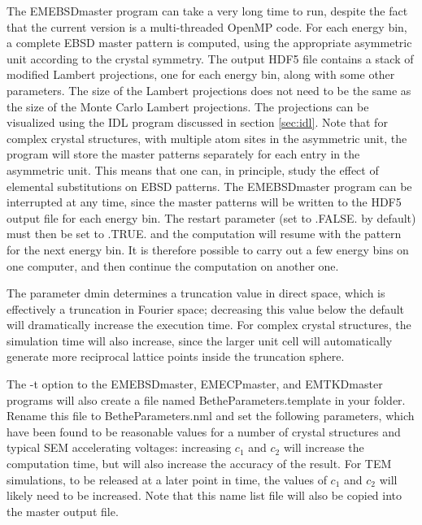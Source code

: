 \documentclass[DIV=calc, paper=letter, fontsize=11pt]{scrartcl}	 %
\begin{document}
The \textsf{EMEBSDmaster} program can take a very long time to run, despite the fact that the current version is a multi-threaded OpenMP code.
For each energy bin, a complete EBSD master pattern is computed, using the appropriate asymmetric unit according to
the crystal symmetry.  The output HDF5 file contains a stack of modified Lambert projections, one for each energy bin, along with 
some other parameters.  The size of the Lambert projections does not need to be the same as the size of the Monte Carlo
Lambert projections.  The projections can be visualized using the IDL program discussed in section \ref{sec:idl}.  
Note that for complex crystal structures,
with multiple atom sites in the asymmetric unit, the program will store the master patterns separately for each entry in the asymmetric unit.
This means that one can, in principle, study the effect of elemental substitutions on EBSD patterns.  The \textsf{EMEBSDmaster}
program can be interrupted at any time, since the master patterns will be written to the HDF5 output file for each energy bin.
The \textsf{restart} parameter (set to \textsf{.FALSE.} by default) must then be set to \textsf{.TRUE.} and the computation will
resume with the pattern for the next energy bin.  It is therefore possible to carry out a few energy bins on one computer, and then
continue the computation on another one.

The parameter \textsf{dmin} determines a truncation value in direct space, which is effectively a truncation in Fourier space; decreasing
this value below the default will dramatically increase the execution time.  For complex crystal structures, the simulation time will also
increase, since the larger unit cell will automatically generate more reciprocal lattice points inside the truncation sphere.

The \textsf{-t} option to the \textsf{EMEBSDmaster}, \textsf{EMECPmaster}, and \textsf{EMTKDmaster} programs will also create a file named \textsf{BetheParameters.template} in
your folder.  Rename this file to \textsf{BetheParameters.nml} and set the following parameters, which have been found to be 
reasonable values for a number of crystal structures and typical SEM accelerating voltages:
increasing $c_1$ and $c_2$ will increase the computation time, but will also increase the accuracy of the result. For TEM simulations,
to be released at a later point in time, the values of $c_1$ and $c_2$ will likely need to be increased.  Note that this name list file will
also be copied into the master output file.
\end{document}
